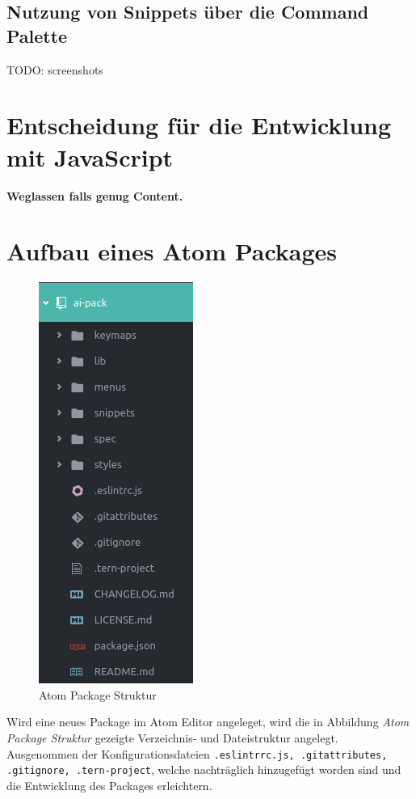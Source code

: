         \subsection{Nutzung von Snippets über die Command Palette}
            TODO: screenshots

    \section{Entscheidung für die Entwicklung mit JavaScript}
    \textbf{Weglassen falls genug Content.}

    \section{Aufbau eines Atom Packages}
    \begin{figure}
        \includegraphics[scale=1.0]{img/package_structure.png}
        \caption{Atom Package Struktur}
    \end{figure}
    Wird eine neues Package im Atom Editor angeleget, wird die in Abbildung \textit{Atom Package Struktur} gezeigte Verzeichnis- und Dateistruktur angelegt. Ausgenommen der Konfigurationsdateien \texttt{.eslintrrc.js, .gitattributes, .gitignore, .tern-project}, welche nachträglich hinzugefügt worden sind und die Entwicklung des Packages erleichtern.

